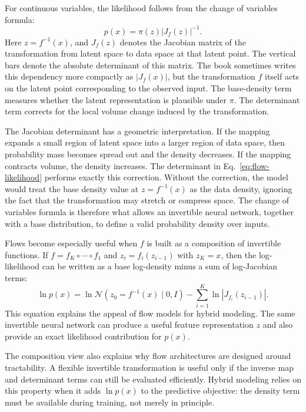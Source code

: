 \documentclass[runningheads]{llncs}
\begin{document}
For continuous variables, the likelihood follows from the change of variables
formula:
\begin{equation}
p(x)=\pi(z)\left|J_f(z)\right|^{-1}.
\label{eq:flow-likelihood}
\end{equation}
Here \(z=f^{-1}(x)\), and \(J_f(z)\) denotes the Jacobian matrix of the
transformation from latent space to data space at that latent point. The vertical
bars denote the absolute determinant of this matrix. The book sometimes writes
this dependency more compactly as \(|J_f(x)|\), but the transformation \(f\)
itself acts on the latent point corresponding to the observed input. The
base-density term measures whether the latent representation is plausible under
\(\pi\). The determinant term corrects for the local volume change induced by
the transformation.

The Jacobian determinant has a geometric interpretation. If the mapping
expands a small region of latent space into a larger region of data space, then
probability mass becomes spread out and the density decreases. If the mapping
contracts volume, the density increases. The determinant in
Eq.~\eqref{eq:flow-likelihood} performs exactly this correction. Without the
correction, the model would treat the base density value at \(z=f^{-1}(x)\) as
the data density, ignoring the fact that the transformation may stretch or
compress space. The change of variables formula is therefore what allows an
invertible neural network, together with a base distribution, to define a valid
probability density over inputs.

Flows become especially useful when \(f\) is built as a composition of
invertible functions. If \(f=f_K\circ\cdots\circ f_1\) and
\(z_i=f_i(z_{i-1})\) with \(z_K=x\), then the log-likelihood can be written as a
base log-density minus a sum of log-Jacobian terms:
\begin{equation}
\ln p(x)
=
\ln \mathcal{N}\!\left(z_0=f^{-1}(x)\mid 0,I\right)
-
\sum_{i=1}^{K}\ln |J_{f_i}(z_{i-1})|.
\label{eq:flow-loglikelihood}
\end{equation}
This equation explains the appeal of flow models for hybrid modeling. The same
invertible neural network can produce a useful feature representation \(z\) and
also provide an exact likelihood contribution for \(p(x)\).

The composition view also explains why flow architectures are designed around
tractability. A flexible invertible transformation is useful only if the inverse
map and determinant terms can still be evaluated efficiently. Hybrid modeling
relies on this property when it adds \(\ln p(x)\) to the predictive objective:
the density term must be available during training, not merely in principle.
\end{document}
